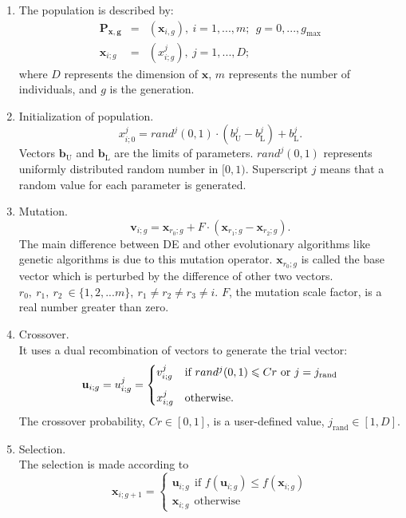 \documentclass[11pt]{article}
\begin{document}
\begin{enumerate}
\item 
The population is described by:
\begin{eqnarray}\nonumber \label{ClassicDE}
\mathbf{P_{\mathbf{x},g}} &=&(\mathbf{x}_{i,g}), ~i=1,...,m;~~g=0,...,
g_{\text{max}}\\
\mathbf{x}_{i;g}&=&(x^j_{i;g}), ~j=1,...,D;
\end{eqnarray}
where $D$ represents the dimension of $\mathbf{x}$, $m$ represents the 
number of individuals, and $g$ is the generation.

\item
Initialization of population.
\begin{equation*}
x^j_{i;0}=rand^j(0,1)\cdot (b^j_{\text{U}}-b^j_{\text{L}})+
b^j_{\text{L}}.
\end{equation*}
Vectors $\mathbf{b}_{\text{U}}$ and $\mathbf{b}_{\text{L}}$ are the 
limits of parameters.
$rand^j(0,1)$ represents uniformly distributed random number in $[0,1)$.
Superscript $j$ means that a random value for each parameter is 
generated.
\item
Mutation.
\begin{equation}
\mathbf{v}_{i;g}=\mathbf{x}_{r_0;g}+F\cdot (\mathbf{x}_{r_1;g}-
\mathbf{x}_{r_2;g}).
\end{equation}
The main difference between DE and other evolutionary algorithms like 
genetic algorithms is due to this mutation operator. 
$\mathbf{x}_{r_0;g}$ is called the base vector which is perturbed by the 
difference of other two vectors.
 $r_0, ~r_1,~r_2~\in \{1,2,...m\},~ r_1\neq r_2\neq r_3\neq i$.
$F$, the mutation scale factor, is a real number greater than zero.

\item
Crossover.\\
It uses a dual recombination of vectors to generate the trial vector:
\begin{equation}\label{DECrossover}
\mathbf{u}_{i;g} = u^j_{i;g}=
\begin{cases}
v^j_{i;g} & \text{if $rand^j(0,1)\leqslant Cr$ or $j=j_{\text{rand}}$}
\vspace*{0.3cm}\\
x^j_{i;g} & \text{otherwise.}
\end{cases}
\end{equation}
The crossover probability, $Cr \in [0,1]$, is a user-defined value, 
$j_{\text{rand}} \in [1,D]$.
\item
Selection.\\
The selection is made according to
\begin{equation}\label{finClassicDE}
\mathbf{x}_{i;g+1}=\left \lbrace \begin{array}{l} \mathbf{u}_{i;g}~~
\text{if $f(\mathbf{u}_{i;g})\leqslant f(\mathbf{x}_{i;g})$}  \\
\mathbf{x}_{i;g}~~\text{otherwise}
 \end{array}\right. 
 \end{equation}
\end{enumerate}
\end{document}
